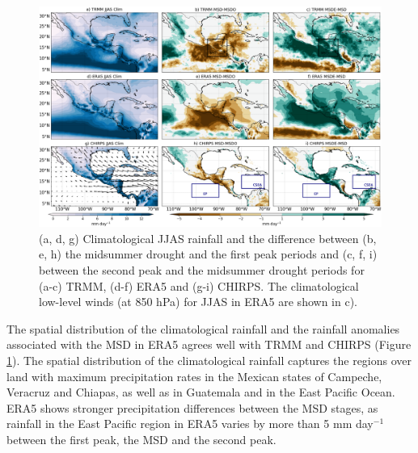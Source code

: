   \begin{figure}[t!]
\includegraphics[width=\linewidth]{figures/fig2obs_prdiff_2.png}
\caption{ (a, d, g) Climatological JJAS rainfall and the difference between  (b, e, h)  the midsummer drought and the first peak periods and (c, f, i)  between the second peak and the midsummer drought periods for (a-c) TRMM, (d-f) ERA5 and (g-i) CHIRPS. The climatological low-level winds (at 850 hPa) for JJAS in ERA5 are shown in c). }
\label{fig:eof2}
\end{figure} 
 



The spatial distribution of the climatological rainfall and the rainfall anomalies associated with the MSD in ERA5 agrees well with TRMM and CHIRPS (Figure \ref{fig:eof2}). The spatial distribution of the climatological rainfall captures the regions over land with maximum precipitation rates in the Mexican states of Campeche, Veracruz and Chiapas, as well as in Guatemala and in the East Pacific Ocean. ERA5 shows stronger precipitation differences between the MSD stages, as rainfall in the East Pacific region in ERA5 varies by more than 5 mm day$^{-1}$ between the first peak, the MSD and the second peak. 


